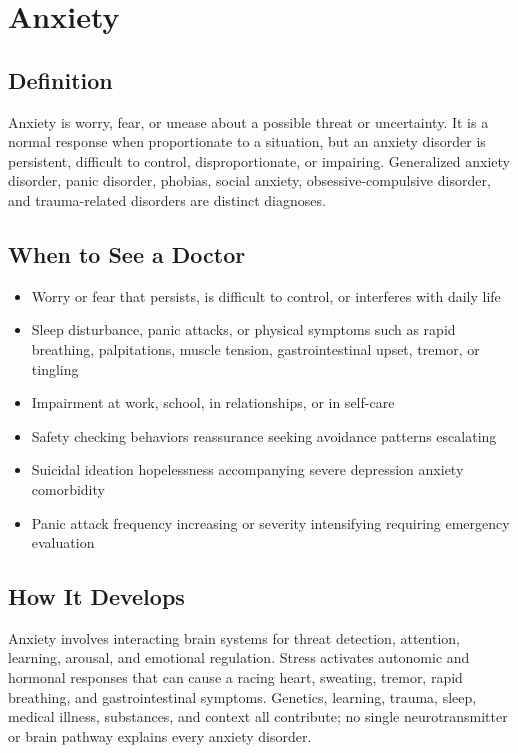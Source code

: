 \chapter{Anxiety}

\section*{Definition}
Anxiety is worry, fear, or unease about a possible threat or uncertainty. It is a normal response when proportionate to a situation, but an anxiety disorder is persistent, difficult to control, disproportionate, or impairing. Generalized anxiety disorder, panic disorder, phobias, social anxiety, obsessive-compulsive disorder, and trauma-related disorders are distinct diagnoses.

\section*{When to See a Doctor}

\begin{itemize}
 \item Worry or fear that persists, is difficult to control, or interferes with daily life
 \item Sleep disturbance, panic attacks, or physical symptoms such as rapid breathing, palpitations, muscle tension, gastrointestinal upset, tremor, or tingling
 \item Impairment at work, school, in relationships, or in self-care
 \item Safety checking behaviors reassurance seeking avoidance patterns escalating
 \item Suicidal ideation hopelessness accompanying severe depression anxiety comorbidity
 \item Panic attack frequency increasing or severity intensifying requiring emergency evaluation
\end{itemize}

\section*{How It Develops}
Anxiety involves interacting brain systems for threat detection, attention, learning, arousal, and emotional regulation. Stress activates autonomic and hormonal responses that can cause a racing heart, sweating, tremor, rapid breathing, and gastrointestinal symptoms. Genetics, learning, trauma, sleep, medical illness, substances, and context all contribute; no single neurotransmitter or brain pathway explains every anxiety disorder.

